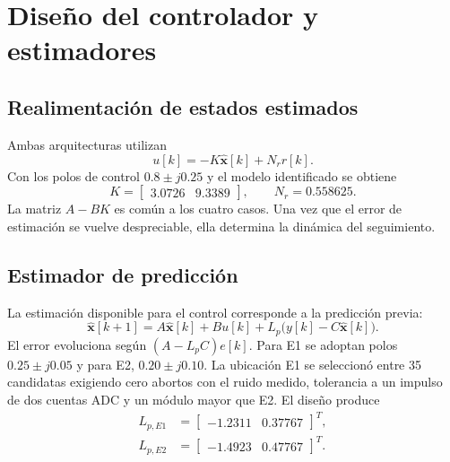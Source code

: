 \section{Diseño del controlador y estimadores}
\subsection{Realimentación de estados estimados}
Ambas arquitecturas utilizan
\begin{equation}\label{eq:control}
u[k]=-K\widehat{\mathbf{x}}[k]+N_r r[k].
\end{equation}
Con los polos de control $0.8\pm j0.25$ y el modelo identificado se obtiene
\begin{equation}
K=\begin{bmatrix}3.0726&9.3389\end{bmatrix},\qquad N_r=0.558625.
\end{equation}
La matriz $A-BK$ es común a los cuatro casos. Una vez que el error de estimación se
vuelve despreciable, ella determina la dinámica del seguimiento.

\subsection{Estimador de predicción}
La estimación disponible para el control corresponde a la predicción previa:
\begin{equation}
\widehat{\mathbf{x}}[k+1]=A\widehat{\mathbf{x}}[k]+Bu[k]
+L_p\bigl(y[k]-C\widehat{\mathbf{x}}[k]\bigr).
\end{equation}
El error evoluciona según $(A-L_pC)e[k]$. Para E1 se adoptan polos
$0.25\pm j0.05$ y para E2, $0.20\pm j0.10$. La ubicación E1 se seleccionó
entre 35 candidatas exigiendo cero abortos con el ruido medido, tolerancia a
un impulso de dos cuentas ADC y un módulo mayor que E2. El diseño produce
\begin{align}
L_{p,E1}&=\begin{bmatrix}-1.2311&0.37767\end{bmatrix}^{T},\\
L_{p,E2}&=\begin{bmatrix}-1.4923&0.47767\end{bmatrix}^{T}.
\end{align}

